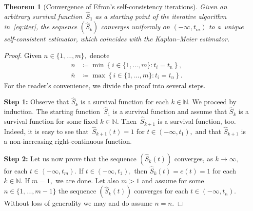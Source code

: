 \documentclass{amsart}
\theoremstyle{plain}
\newtheorem{thm}{Theorem}[section]
\theoremstyle{definition}
\def\l{\left}
\def\r{\right}
\def\as{\coloneqq}
\def\nat{\mathbb{N}}
\def\col{\colon}
\def\ol{\overline}
\def\un{\underline{n}}
\renewcommand{\hat}{\widehat}
\begin{document}
\begin{thm}[Convergence of Efron's self-consistency iterations] \label{thm:main} Given an arbitrary survival function~$\hat{S}_1$ as a starting point of the iterative algorithm in~\eqref{eq:iter}, the sequence $\l(\hat{S}_k\r)$ converges uniformly on $\l(-\infty,t_m\r)$ to a~unique self-consistent estimator, which coincides with the Kaplan--Meier estimator.
\end{thm}
\begin{proof}
Given $n\in\{1,\dots, m\},$ denote
\begin{align*}
 \un & \as \min\l\{i\in\{1,\dots,m\}\col t_i = t_n  \r\} ,\\
 \overline{n} & \as \max\l\{i\in\{1,\dots,m\}\col t_i = t_n  \r\} .
\end{align*}
For the reader's convenience, we divide the proof into several steps. 

\textbf{Step 1:} Observe that $\hat{S}_k$ is a survival function for each $k\in\nat.$ We proceed by induction. The starting function~$\hat{S}_1$ is a survival function and assume that $\hat{S}_k$ is a survival function for some fixed $k\in\nat.$ Then~$\hat{S}_{k+1}$ is a survival function, too. Indeed, it is easy to see that~$\hat{S}_{k+1}(t)=1$ for $t\in\l(-\infty,t_1\r),$ and that $\hat{S}_{k+1}$ is a non-increasing right-continuous function.

\textbf{Step 2:} Let us now prove that the sequence $\l(\hat{S}_k(t)\r)$ converges, as $k\to\infty,$ for each $t\in\l(-\infty,t_m\r).$ If $t\in\l(-\infty,t_1\r),$ then $\hat{S}_k(t)=e(t)=1$ for each $k\in\nat.$ If $m=1,$ we are done. Let also $m>1$ and assume for some $n\in\{1,\dots,m-1\}$ the sequence $\l(\hat{S}_k(t)\r)$ converges for each $t\in\l(-\infty,t_n\r).$ Without loss of generality we may and do assume $n=\ol{n}.$ 


\end{proof}
\end{document}
